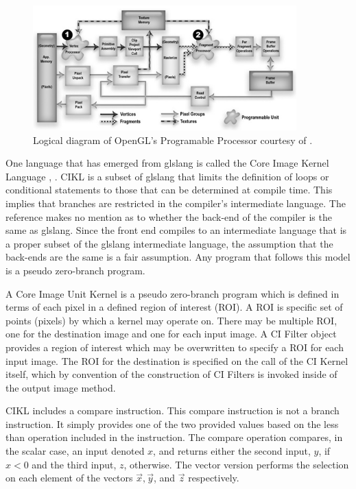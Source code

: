 \documentclass[11pt]{article}
\begin{document}
\begin{figure}[htbp] %
   \centering
   \includegraphics[width=4in]{graphicsProcessorModel.jpg} 
   \caption{Logical diagram of OpenGL's Programable Processor courtesy of \cite{glslRost}.}
   \label{fig-programable-processor}
\end{figure}

One language that has emerged from glslang is called the Core Image Kernel Language \cite{apple-core-image}, \cite{ciklReference}.  CIKL is a subset of glslang that limits the definition of loops or conditional statements to those that can be determined at compile time.  This implies that branches are restricted in the compiler's intermediate language.  The reference makes no mention as to whether the back-end of the compiler is the same as glslang.  Since the front end compiles to an intermediate language that is a proper subset of the glslang intermediate language, the assumption that the back-ends are the same is a fair assumption.  Any program that follows this model is a pseudo zero-branch program.


A Core Image Unit Kernel is a pseudo zero-branch program which is defined in terms of each pixel in a defined region of interest (ROI).
A ROI is specific set of points (pixels) by which a kernel may operate on.  There may be multiple ROI, one for the destination image and one for each input image.   A CI Filter object provides a region of interest which may be overwritten to specify a ROI for each input image.  The ROI for the destination is specified on the call of the CI Kernel itself, which by convention of the construction of CI Filters is invoked inside of the output image method.


CIKL includes a compare instruction.  This compare instruction is not a branch instruction.  It simply provides one of the two provided values based on the less than operation included in the instruction. The compare operation compares, in the scalar case,  an input denoted $x$, and returns either the second input, $y$, if $x < 0$ and the third input, $z$, otherwise.  The vector version performs the selection on each element of the vectors $\vec{x}, \vec{y}$, and $\vec{z}$ respectively.
\end{document}
